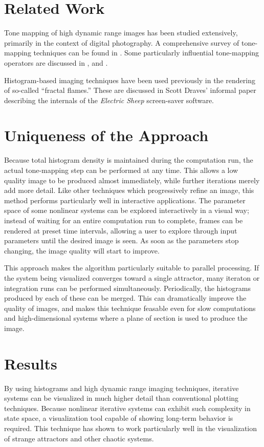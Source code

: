 \documentclass[letterpaper, 11pt]{article}
\begin{document}
\section{Related Work}
Tone mapping of high dynamic range images has been studied extensively, primarily in the
context of digital photography.  A comprehensive survey of tone-mapping techniques can be
found in \cite{kd}.  Some particularly influential tone-mapping operators are discussed
in \cite{jt}, \cite{jtjhbg} and \cite{gw}.

Histogram-based imaging techniques have been used previously in the rendering of so-called
``fractal flames.''  These are discussed in Scott Draves' informal paper describing the
internals of the \emph{Electric Sheep} screen-saver software\cite{sd}.

\section{Uniqueness of the Approach}
Because total histogram density is maintained during the computation run, the actual
tone-mapping step can be performed at any time.  This allows a low quality image to
be produced almost immediately, while further iterations merely add more detail.  Like
other techniques which progressively refine an image, this method performs particularly
well in interactive applications.  The parameter space of some nonlinear systems can be
explored interactively in a visual way; instead of waiting for an entire computation run
to complete, frames can be rendered at preset time intervals, allowing a user to explore
through input parameters until the desired image is seen.  As soon as the parameters
stop changing, the image quality will start to improve.

This approach makes the algorithm particularly suitable to parallel processing.  If the
system being visualized converges toward a single attractor, many iteraton or integration
runs can be performed simultaneously.  Periodically, the histograms produced by each
of these can be merged.  This can dramatically improve the quality of images, and makes
this technique feasable even for slow computations and high-dimensional systems where a
plane of section is used to produce the image.

\section{Results}
By using histograms and high dynamic range imaging techniques, iterative systems can be
visualized in much higher detail than conventional plotting techniques.  Because
nonlinear iterative systems can exhibit such complexity in state space, a visualization
tool capable of showing long-term behavior is required. This technique has shown to
work particularly well in the visualization of strange attractors and other chaotic
systems.
\end{document}
